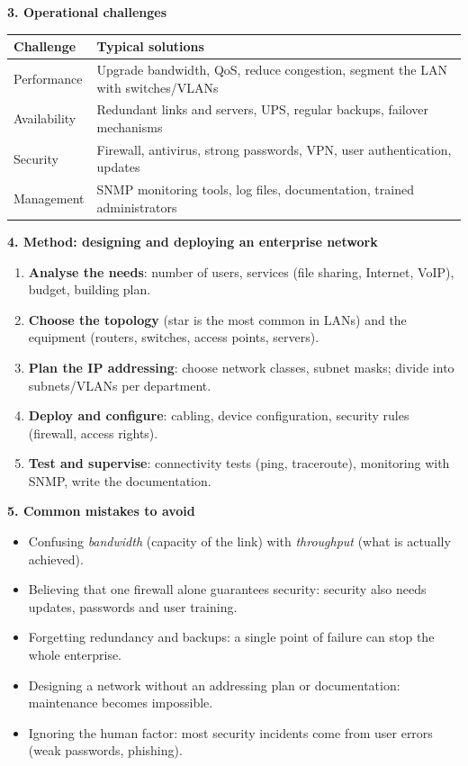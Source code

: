 \documentclass[11pt]{article}
\begin{document}
\begin{bilan}
\textbf{3. Operational challenges}\par
\begin{center}
\begin{tabularx}{\linewidth}{|l|X|}\hline
\rowcolor{popblueL} \textbf{Challenge} & \textbf{Typical solutions} \\ \hline
Performance & Upgrade bandwidth, QoS, reduce congestion, segment the LAN with switches/VLANs \\ \hline
Availability & Redundant links and servers, UPS, regular backups, failover mechanisms \\ \hline
Security & Firewall, antivirus, strong passwords, VPN, user authentication, updates \\ \hline
Management & SNMP monitoring tools, log files, documentation, trained administrators \\ \hline
\end{tabularx}
\end{center}

\textbf{4. Method: designing and deploying an enterprise network}\par
\begin{enumerate}
\item \textbf{Analyse the needs}: number of users, services (file sharing, Internet, VoIP), budget, building plan.
\item \textbf{Choose the topology} (star is the most common in LANs) and the equipment (routers, switches, access points, servers).
\item \textbf{Plan the IP addressing}: choose network classes, subnet masks; divide into subnets/VLANs per department.
\item \textbf{Deploy and configure}: cabling, device configuration, security rules (firewall, access rights).
\item \textbf{Test and supervise}: connectivity tests (ping, traceroute), monitoring with SNMP, write the documentation.
\end{enumerate}

\textbf{5. Common mistakes to avoid}\par
\begin{itemize}
\item Confusing \emph{bandwidth} (capacity of the link) with \emph{throughput} (what is actually achieved).
\item Believing that one firewall alone guarantees security: security also needs updates, passwords and user training.
\item Forgetting redundancy and backups: a single point of failure can stop the whole enterprise.
\item Designing a network without an addressing plan or documentation: maintenance becomes impossible.
\item Ignoring the human factor: most security incidents come from user errors (weak passwords, phishing).
\end{itemize}


\end{bilan}
\end{document}
